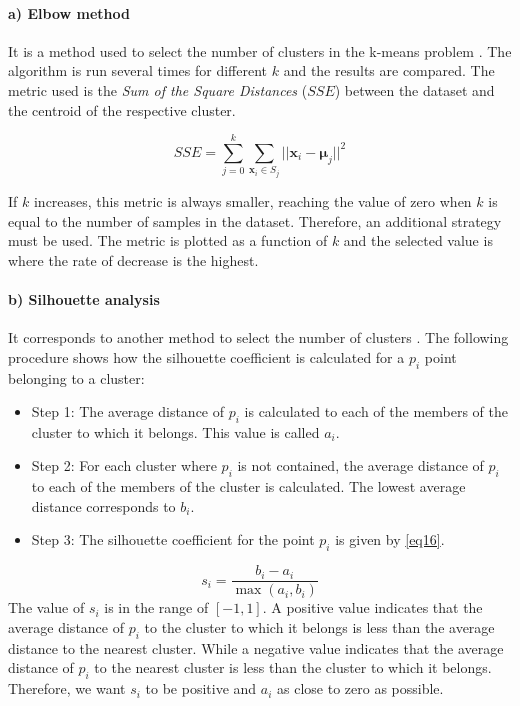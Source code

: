 \documentclass[conference]{IEEEtran}
\begin{document}
\paragraph*{a) Elbow method}
It is a method used to select the number of clusters in the k-means problem \cite{ebk_means_purnima}. The algorithm is run several times for different $k$ and the results are compared. The metric used is the \textit{Sum of the Square Distances} ($SSE$) between the dataset and the centroid of the respective cluster. 

\begin{equation}
\label{eq15}
SSE = \sum_{j=0}^{k} \sum_{ \boldsymbol{x}_i \in S_j} {|| \boldsymbol{x}_i  - \boldsymbol{\mu}_j||}^{2}
\end{equation}

If $k$ increases, this metric is always smaller, reaching the value of zero when $k$ is equal to the number of samples in the dataset. Therefore, an additional strategy must be used. The metric is plotted as a function of $k$ and the selected value is where the rate of decrease is the highest.

\paragraph*{b) Silhouette analysis} 

It corresponds to another method to select the number of clusters \cite{silhouettes_a_rousseeuw}. The following procedure shows how the silhouette coefficient is calculated for a $p_i$ point belonging to a cluster:

\begin{itemize}

\item{Step 1:}
The average distance of $p_i$ is calculated to each of the members of the cluster to which it belongs. This value is called $a_i$.

\item{Step 2:}
For each cluster where $p_i$ is not contained, the average distance of $p_i$ to each of the members of the cluster is calculated.  The lowest average distance corresponds to $b_i$.
	
\item{Step 3:}
The silhouette coefficient for the point $p_i$ is given by \eqref{eq16}.

\end{itemize}

\begin{equation}
\label{eq16}
s_i = \frac{b_i - a_i} { \max(a_i,b_i)}
\end{equation}
The value of $s_i$ is in the range of $[-1,1]$. A positive value indicates that the average distance of $p_i$ to the cluster to which it belongs is less than the average distance to the nearest cluster. While a negative value indicates that the average distance of $p_i$ to the nearest cluster is less than the cluster to which it belongs. Therefore, we want $s_i$ to be positive and $a_i$ as close to zero as possible. 
\end{document}

